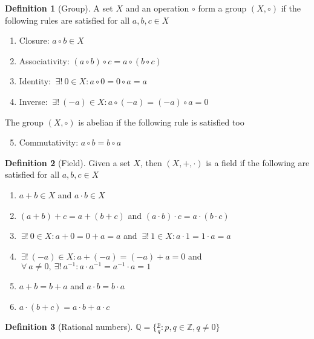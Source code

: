 \documentclass{article}
\newenvironment{enumrom}{\begin{enumerate}[label=(\roman*)]}{\end{enumerate}}
\newcommand{\fr}[2]{\frac{#1}{#2}}
\theoremstyle{definition}
\newtheorem{definition}{Definition}[section]
\theoremstyle{definition}
\theoremstyle{plain}
\theoremstyle{plain}
\theoremstyle{plain}
\theoremstyle{plain}
\theoremstyle{definition}
\theoremstyle{remark}
\theoremstyle{remark}
\theoremstyle{remark}
\theoremstyle{remark}
\newcommand{\Z}{\mathbb{Z}}
\newcommand{\Q}{\mathbb{Q}}
\newcommand{\ForAll}{\ \forall \ }
\newcommand{\ExistsI}{\ \exists! \ }
\begin{document}
\begin{definition}[Group]
  A set $X$ and an operation $\circ$ form a group $(X, \circ)$ if the following rules are satisfied for all $a, b, c \in X$
  \begin{enumrom}
  \item Closure: $a \circ b \in X$
  \item Associativity: $(a \circ b) \circ c = a \circ (b \circ c)$
  \item Identity: $\ExistsI 0 \in X : a \circ 0 = 0 \circ a = a$
  \item Inverse: $\ExistsI (-a) \in X : a \circ (-a) = (-a) \circ a = 0$
  \end{enumrom}
  The group $(X, \circ)$ is abelian if the following rule is satisfied too
  \begin{enumrom}
    \setcounter{enumi}{4}
  \item Commutativity: $a \circ b = b \circ a$
  \end{enumrom}
\end{definition}




\begin{definition}[Field]
  Given a set $X$, then $(X, +, \cdot)$ is a field if the following are satisfied for all $a, b, c \in X$
  \begin{enumrom}
  \item $a + b \in X$ and $a \cdot b \in X$
  \item $(a + b) + c = a + (b + c)$ and $(a \cdot b) \cdot c = a \cdot (b \cdot c)$
  \item $\ExistsI 0 \in X : a + 0 = 0 + a = a$ and $\ExistsI 1 \in X : a \cdot 1 = 1 \cdot a = a$
  \item $\ExistsI (-a) \in X : a + (-a) = (-a) + a = 0$ and $\ForAll a \neq 0, \ExistsI a^{-1} : a \cdot a^{-1} = a^{-1} \cdot a = 1$
  \item $a + b = b + a$ and $a \cdot b = b\cdot a$
  \item $a \cdot (b + c) = a \cdot b + a \cdot c$
  \end{enumrom}
\end{definition}




\begin{definition}[Rational numbers]
  $\Q = \{ \fr{p}{q} : p, q \in \Z, q \neq 0 \}$
\end{definition}
\end{document}
